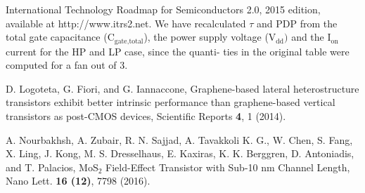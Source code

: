 \documentclass[aps,reprint,superscriptaddress,secnumarabic,amssymb,showpacs]{revtex4-1}
\begin{document}
\begin{thebibliography}{100}
 International Technology Roadmap for Semiconductors 2.0, 2015 edition, available at http://www.itrs2.net. We have recalculated $\tau$ and PDP from the total gate capacitance (C$_{\text{gate,total}}$), the power supply voltage (V$_{\text{dd}})$ and the I$_{\text{on}}$ current for the HP and LP case, since the quanti- ties in the original table were computed for a fan out of 3.

 D. Logoteta, G. Fiori, and G. Iannaccone, 
Graphene-based lateral heterostructure transistors exhibit better intrinsic performance than graphene-based vertical transistors as post-CMOS devices,
Scientific Reports \textbf{4}, 1 (2014).

 A. Nourbakhsh, A. Zubair, R. N. Sajjad, A. Tavakkoli K. G., W. Chen, S. Fang, X. Ling, J. Kong, M. S. Dresselhaus, E. Kaxiras, K. K. Berggren, D. Antoniadis, and T. Palacios,
MoS$_2$ Field-Effect Transistor with Sub-10 nm Channel Length,
Nano Lett. \textbf{16 (12)}, 7798 (2016).

\end{thebibliography}
\end{document}
